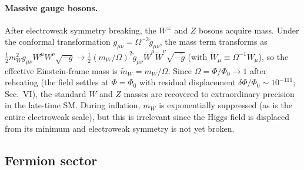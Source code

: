 \documentclass[pdflatex,sn-mathphys-num]{sn-jnl}
\newcommand{\PhiV}{\Phi_0}
\theoremstyle{thmstyleone}
\begin{document}
\paragraph{Massive gauge bosons.} After electroweak symmetry breaking, the $W^\pm$ and $Z$ bosons acquire mass. Under the conformal transformation $g_{\mu\nu}=\Omega^{-2}\tilde g_{\mu\nu}$, the mass term transforms as $\frac12 m_W^2 g_{\mu\nu}W^\mu W^\nu\sqrt{-g}\to\frac12 (m_W/\Omega)^2\tilde g_{\mu\nu}\tilde W^\mu\tilde W^\nu\sqrt{-\tilde g}$ (with $\tilde W_\mu\equiv\Omega^{-1}W_\mu$), so the effective Einstein-frame mass is $\tilde m_W=m_W/\Omega$. Since $\Omega=\Phi/\PhiV\to1$ after reheating (the field settles at $\Phi=\PhiV$ with residual displacement $\delta\Phi/\PhiV\sim10^{-111}$; Sec.~VI), the standard $W$ and $Z$ masses are recovered to extraordinary precision in the late-time SM. During inflation, $m_W$ is exponentially suppressed (as is the entire electroweak scale), but this is irrelevant since the Higgs field is displaced from its minimum and electroweak symmetry is not yet broken.

\subsection{Fermion sector}
\end{document}
